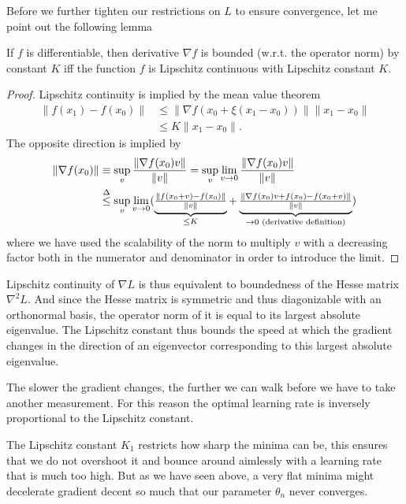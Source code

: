 Before we further tighten our restrictions on \(L\) to ensure convergence, let
me point out the following lemma
%
\begin{lemma}\label{lem: lipschitz and bounded derivative}
	If \(f\) is differentiable, then derivative \(\nabla f\) is
	bounded (w.r.t. the operator norm) by constant \(K\) iff the function
	\(f\) is Lipschitz continuous with Lipschitz constant \(K\).
\end{lemma}
\begin{proof}
	Lipschitz continuity is implied by the mean value theorem
	\begin{align*}
		\|f(x_1) - f(x_0)\|
		&\le \|\nabla f(x_0 + \xi(x_1-x_0))\| \|x_1- x_0\|\\
		&\le K \|x_1-x_0\|.
	\end{align*}
	The opposite direction is implied by
	\begin{align*}
		\|\nabla f(x_0)\|
		&\equiv \sup_{v} \frac{\|\nabla f(x_0)v\|}{\|v\|}
		= \sup_{v} \lim_{v\to 0}\frac{\|\nabla f(x_0)v\|}{\|v\|}\\
		&\lxle{\Delta}\sup_{v} \lim_{v\to 0}
		(
			\underbrace{
				\tfrac{\|f(x_0 + v) - f(x_0) \|}{\|v\|}
			}_{
				\le K
			}
			+ \underbrace{
				\tfrac{\|\nabla f(x_0)v + f(x_0) - f(x_0 +v)\|}{\|v\|}
			}_{
				\to 0 \text{ (derivative definition)}
			}
		)
	\end{align*}
	where we have used the scalability of the norm to multiply \(v\) with a
	decreasing factor both in the numerator and denominator in order to introduce
	the limit.
\end{proof}

Lipschitz continuity of \(\nabla L\) is thus equivalent to boundedness of the
Hesse matrix \(\nabla^2 L\). And since the Hesse matrix is symmetric and thus
diagonizable with an orthonormal basis, the operator norm of it is equal to its
largest absolute eigenvalue. The Lipschitz constant thus bounds the speed at
which the gradient changes in the direction of an eigenvector corresponding to
this largest absolute eigenvalue.

The slower the gradient changes, the further we can walk before we have to
take another measurement. For this reason the optimal learning rate is
inversely proportional to the Lipschitz constant.

The Lipschitz constant \(K_1\) restricts how sharp the minima can be, 
this ensures that we do not overshoot it and bounce around aimlessly with a 
learning rate that is much too high. But as we have seen above, a very flat
minima might decelerate gradient decent so much that our parameter \(\theta_n\)
never converges.

